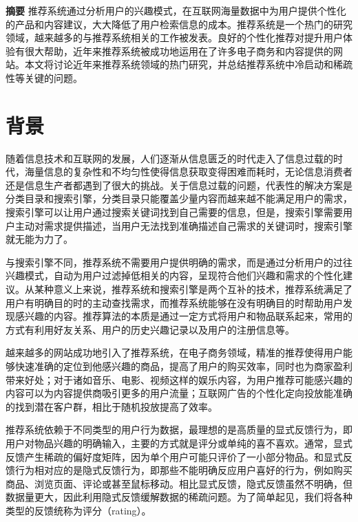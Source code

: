 

\centerline{\textbf{}}
\bigskip

\textbf{摘要}\quad 
推荐系统通过分析用户的兴趣模式，在互联网海量数据中为用户提供个性化的产品和内容建议，大大降低了用户检索信息的成本。推荐系统是一个热门的研究领域，越来越多的与推荐系统相关的工作被发表。良好的个性化推荐对提升用户体验有很大帮助，近年来推荐系统被成功地运用在了许多电子商务和内容提供的网站。本文将讨论近年来推荐系统领域的热门研究，并总结推荐系统中冷启动和稀疏性等关键的问题。

\chapter{背景}
随着信息技术和互联网的发展，人们逐渐从信息匮乏的时代走入了信息过载的时代，海量信息的复杂性和不均匀性使得信息获取变得困难而耗时，无论信息消费者还是信息生产者都遇到了很大的挑战。关于信息过载的问题，代表性的解决方案是分类目录和搜索引擎，分类目录只能覆盖少量内容而越来越不能满足用户的需求，搜索引擎可以让用户通过搜索关键词找到自己需要的信息，但是，搜索引擎需要用户主动对需求提供描述，当用户无法找到准确描述自己需求的关键词时，搜索引擎就无能为力了。

与搜索引擎不同，推荐系统不需要用户提供明确的需求，而是通过分析用户的过往兴趣模式，自动为用户过滤掉低相关的内容，呈现符合他们兴趣和需求的个性化建议。从某种意义上来说，推荐系统和搜索引擎是两个互补的技术，推荐系统满足了用户有明确目的时的主动查找需求，而推荐系统能够在没有明确目的时帮助用户发现感兴趣的内容\cite{项亮2012推荐系统实践}。推荐算法的本质是通过一定方式将用户和物品联系起来，常用的方式有利用好友关系、用户的历史兴趣记录以及用户的注册信息等。

越来越多的网站成功地引入了推荐系统，在电子商务领域，精准的推荐使得用户能够快速准确的定位到他感兴趣的商品，提高了用户的购买效率，同时也为商家盈利带来好处；对于诸如音乐、电影、视频这样的娱乐内容，为用户推荐可能感兴趣的内容可以为内容提供商吸引更多的用户流量；互联网广告的个性化定向投放能准确的找到潜在客户群，相比于随机投放提高了效率。

推荐系统依赖于不同类型的用户行为数据，最理想的是高质量的显式反馈行为，即用户对物品兴趣的明确输入，主要的方式就是评分或单纯的喜不喜欢。通常，显式反馈产生稀疏的偏好度矩阵，因为单个用户可能只评价了一小部分物品。和显式反馈行为相对应的是隐式反馈行为，即那些不能明确反应用户喜好的行为，例如购买商品、浏览页面、评论或甚至鼠标移动。相比显式反馈，隐式反馈虽然不明确，但数据量更大，因此利用隐式反馈缓解数据的稀疏问题。为了简单起见，我们将各种类型的反馈统称为评分（rating）。

